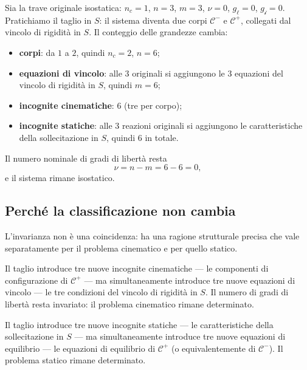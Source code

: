 Sia la trave originale isostatica: $n_c = 1$, $n = 3$,
$m = 3$, $\nu = 0$, $g_\ell = 0$, $g_{\mathscr{i}} = 0$.
Pratichiamo il taglio in $S$: il sistema diventa due
corpi $\mathcal{C}^-$ e $\mathcal{C}^+$, collegati dal
vincolo di rigidità in $S$. Il conteggio delle grandezze
cambia:
\begin{itemize}[nosep]
	\item \textbf{corpi}: da $1$ a $2$, quindi
	$n_c = 2$, $n = 6$;
	\item \textbf{equazioni di vincolo}: alle $3$
	originali si aggiungono le $3$ equazioni del
	vincolo di rigidità in $S$, quindi $m = 6$;
	\item \textbf{incognite cinematiche}: $6$ (tre per
	corpo);
	\item \textbf{incognite statiche}: alle $3$ reazioni
	originali si aggiungono le caratteristiche della
	sollecitazione in $S$, quindi $6$ in totale.
\end{itemize}
Il numero nominale di gradi di libertà resta
\begin{equation}
	\nu = n - m = 6 - 6 = 0,
\end{equation}
e il sistema rimane isostatico.

\subsection{Perché la classificazione non cambia}
\label{sec:perche_invarianza}

L'invarianza non è una coincidenza: ha una ragione
strutturale precisa che vale separatamente per il
problema cinematico e per quello statico.

Il taglio introduce tre nuove incognite cinematiche
--- le componenti di configurazione di $\mathcal{C}^+$
--- ma simultaneamente introduce tre nuove equazioni
di vincolo --- le tre condizioni del vincolo di rigidità
in $S$. Il numero di gradi di libertà resta invariato:
il problema cinematico rimane determinato.

Il taglio introduce tre nuove incognite statiche
--- le caratteristiche della sollecitazione in $S$ ---
ma simultaneamente introduce tre nuove equazioni di
equilibrio --- le equazioni di equilibrio di
$\mathcal{C}^+$ (o equivalentemente di $\mathcal{C}^-$).
Il problema statico rimane determinato.

